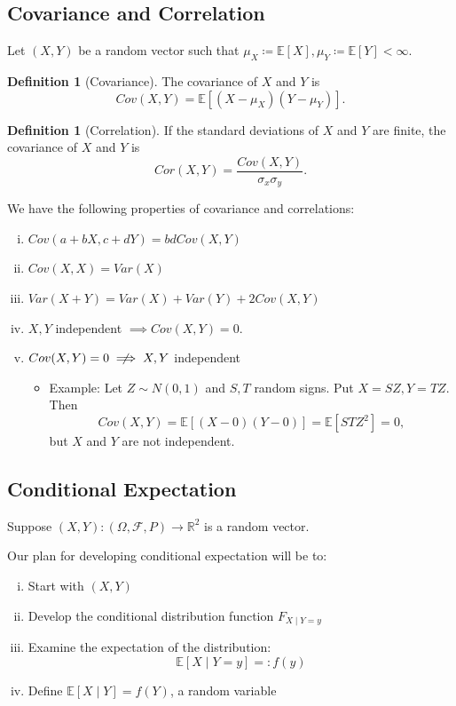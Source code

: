 \documentclass{tufte-handout}
\newcommand*\R{\mathbb{R}}
\newcommand*\E{\mathbb{E}}
\theoremstyle{definition}
\newtheorem{defn}[thm]{Definition}
\begin{document}
\subsection{Covariance and Correlation}

Let $(X,Y)$ be a random vector such that $\mu_X \coloneqq \E\left[X\right], \mu_Y \coloneqq \E\left[Y\right] < \infty$. 

\begin{defn}[Covariance]
	The covariance of $X$ and $Y$ is \[
		Cov(X,Y) = \E\left[\left( X-\mu_X \right)\left( Y - \mu_Y \right)\right] 
	.\] 
\end{defn}

\begin{defn}[Correlation]
	If the standard deviations of $X$ and $Y$ are finite, the covariance of $X$ and $Y$ is \[
		Cor(X,Y) = \frac{Cov(X,Y)}{\sigma_x \sigma_y}
	.\] 
\end{defn}

We have the following properties of covariance and correlations:
\begin{enumerate}[(i)]
	\item $Cov(a + bX, c + dY) = bd Cov(X,Y)$ 
	\item $Cov(X,X) = Var(X)$
	\item $Var(X+Y) = Var(X) + Var(Y) + 2 Cov(X,Y)$
	\item $X,Y$ independent $\implies Cov(X,Y) = 0$.
	\item $Cov(X,Y) = 0 \centernot\implies X,Y$ independent 
		\begin{itemize}
			\item Example: Let $Z \sim N(0,1)$ and $S,T$ random signs. Put $X = SZ, Y = TZ$. Then \[
				Cov(X,Y) = \E\left[(X-0)(Y-0)\right] = \E\left[STZ^2\right] = 0
			,\] but $X$ and $Y$ are not independent.
		\end{itemize}
\end{enumerate}

\subsection{Conditional Expectation}
Suppose $(X,Y): \left( \Omega, \mathscr{F}, P \right) \to \R^2$ is a random vector. 

Our plan for developing conditional expectation will be to:
\begin{enumerate}[(i)]
	\item Start with $(X,Y)$
	\item Develop the conditional distribution function $F_{X \mid Y = y}$
	\item Examine the expectation of the distribution: \[\E\left[X \mid Y = y\right] =: f(y)\]
	\item Define $\E\left[X \mid Y\right] = f(Y)$, a random variable
\end{enumerate}
\end{document}

